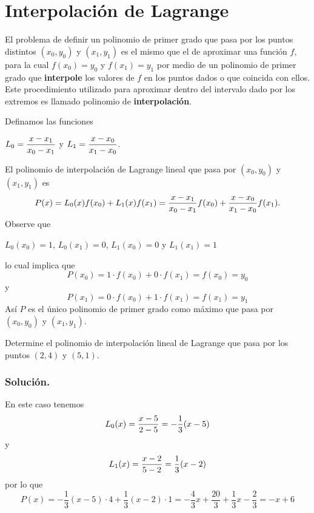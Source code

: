 
\section{Interpolación de Lagrange}
El problema de definir un polinomio de primer grado que pasa por los puntos distintos $(x_0, y_0)$ y $(x_1, y_1)$ es el mismo que el de 
aproximar una función $f$, para la cual $f(x_0) = y_0$ y $f(x_1) = y_1$ por medio de un polinomio de primer grado que \textbf{interpole} 
los valores de $f$ en los puntos dados o que coincida con ellos. Este procedimiento utilizado para aproximar dentro del intervalo dado 
por los extremos es llamado polinomio de \textbf{interpolación}.

Definamos las funciones 

\begin{center}
	$L_0 = \displaystyle{x - x_1\over x_0 - x_1}$ y $L_1 = \displaystyle{x - x_0\over x_1 - x_0}$.
\end{center}

El polinomio de interpolación de Lagrange lineal que pasa por $(x_0, y_0)$ y $(x_1, y_1)$ es
$$P(x) = L_0(x)f(x_0) + L_1(x)f(x_1) = {x - x_1\over x_0 - x_1}f(x_0) + {x - x_0\over x_1 - x_0}f(x_1).$$
Observe que

\begin{center}
	$L_0(x_0) = 1$, $L_0(x_1) = 0$, $L_1(x_0) = 0$ y $L_1(x_1) = 1$
\end{center}

lo cual implica que 
$$P(x_0) = 1\cdot f(x_0) + 0\cdot f(x_1) = f(x_0) = y_0$$
y
$$P(x_1) = 0\cdot f(x_0) + 1\cdot f(x_1) = f(x_1) = y_1$$
Así $P$ es el único polinomio de primer grado como máximo que pasa por $(x_0, y_0)$ y $(x_1, y_1)$.

\begin{exerciseT}
	Determine el polinomio de interpolación lineal de Lagrange que pasa por los puntos $(2, 4)$ y $(5, 1)$.\\
	\subsubsection*{Solución.} En este caso tenemos
		$$L_0(x) = {x-5\over 2-5} = -\frac{1}{3}(x-5)$$	
		y
		$$L_1(x) = {x-2\over 5-2} = \frac{1}{3}(x-2)$$
		por lo que
		$$P(x) = -\frac{1}{3}(x-5)\cdot 4 + \frac{1}{3}(x-2)\cdot 1 = -\frac{4}{3}x + \frac{20}{3} + \frac{1}{3}x - \frac{2}{3} = -x + 6$$
\end{exerciseT}

